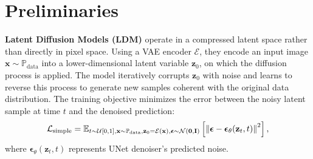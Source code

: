 \vspace{-2mm}
\section{Preliminaries}

\textbf{Latent Diffusion Models (LDM)} \citep{podell2023sdxl,rombach2022high} operate in a compressed latent space rather than directly in pixel space. Using a VAE \citep{kingma2013auto} encoder $\mathcal{E}$, they encode an input image $\mathbf{x} \sim \mathbb{P}_{\mathrm{data}}$ into a lower-dimensional latent variable $\mathbf{z}_0$, on which the diffusion process is applied. The model iteratively corrupts $\mathbf{z}_0$ with noise and learns to reverse this process to generate new samples coherent with the original data distribution. The training objective minimizes the error between the noisy latent sample at time $t$ and the denoised prediction: \begin{equation}  
\small
\mathcal{L}_\mathrm{simple} = \mathbb{E}_{t \sim \mathcal{U}[0,1], \mathbf{x} \sim \mathbb{P}_{\mathrm{data}}, \mathbf{z}_0 = \mathcal{E}(\mathbf{x}) , \boldsymbol{\epsilon} \sim \mathcal{N}(\mathbf{0}, \mathbf{I})}\left[\left\Vert \boldsymbol{\epsilon} - \boldsymbol{\epsilon}_{\theta}(\mathbf{z}_t, t) \right\Vert^2\right],\end{equation} where $\boldsymbol{\epsilon}_{\theta}(\mathbf{z}_t, t)$ represents UNet denoiser's \citep{ho2020denoising, rombach2022high} predicted noise.

